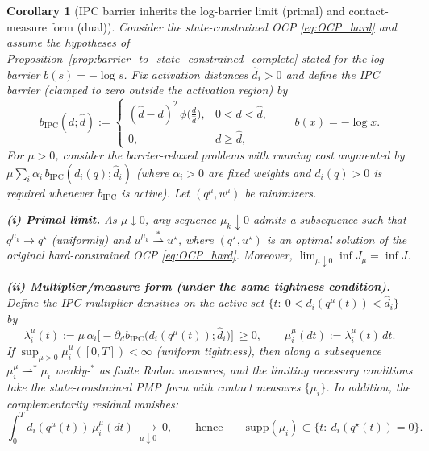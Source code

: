 \documentclass{article} %
\newtheorem{corollary}[theorem]{Corollary}
\begin{document}
\begin{corollary}[IPC barrier inherits the log-barrier limit (primal) and contact-measure form (dual)]
\label{cor:ipc_from_logbarrier}
Consider the state-constrained OCP \cref{eq:OCP_hard} and assume the hypotheses of
Proposition~\ref{prop:barrier_to_state_constrained_complete} stated for the \emph{log-barrier} $b(s)=-\log s$.
Fix activation distances $\hat d_i>0$ and define the IPC barrier (clamped to zero outside the activation region) by
\begin{equation}
\label{eq:ipc_barrier_def}
b_{\mathrm{IPC}}(d;\hat d)
:=
\begin{cases}
(\hat d-d)^2\,\phi\!\big(\frac{d}{\hat d}\big), & 0<d<\hat d,\\
0, & d\ge \hat d,
\end{cases}
\qquad b(x)=-\log x .
\end{equation}
For $\mu>0$, consider the barrier-relaxed problems with running cost augmented by
\(
\mu\sum_i \alpha_i\, b_{\mathrm{IPC}}(d_i(q);\hat d_i)
\)
(where $\alpha_i>0$ are fixed weights and $d_i(q)>0$ is required whenever $b_{\mathrm{IPC}}$ is active).
Let $(q^\mu,u^\mu)$ be minimizers.

\smallskip
\noindent\textbf{(i) Primal limit.}
As $\mu\downarrow 0$, any sequence $\mu_k\downarrow 0$ admits a subsequence such that
\(
q^{\mu_k}\to q^\star
\)
(uniformly) and
\(
u^{\mu_k}\overset{\ast}{\rightharpoonup} u^\star
\),
where $(q^\star,u^\star)$ is an optimal solution of the original hard-constrained OCP \cref{eq:OCP_hard}.
Moreover, $\lim_{\mu\downarrow 0}\inf J_\mu=\inf J$.

\smallskip
\noindent\textbf{(ii) Multiplier/measure form (under the same tightness condition).}
Define the IPC multiplier densities on the active set $\{t:\ 0<d_i(q^\mu(t))<\hat d_i\}$ by
\begin{equation}
\label{eq:ipc_lambda_density}
\lambda_i^\mu(t)
:=\mu\,\alpha_i\Big[-\partial_d b_{\mathrm{IPC}}\big(d_i(q^\mu(t));\hat d_i\big)\Big]\ \ge 0,
\qquad
\mu_i^\mu(dt):=\lambda_i^\mu(t)\,dt .
\end{equation}
If $\sup_{\mu>0}\mu_i^\mu([0,T])<\infty$ (uniform tightness), then along a subsequence
$\mu_i^\mu \rightharpoonup^\ast \mu_i$ weakly-$^\ast$ as finite Radon measures, and the limiting necessary conditions
take the state-constrained PMP form with contact measures $\{\mu_i\}$.
In addition, the complementarity residual vanishes:
\begin{equation}
\label{eq:ipc_comp_residual}
\int_0^T d_i(q^\mu(t))\,\mu_i^\mu(dt)\ \xrightarrow[\mu\downarrow 0]{}\ 0,
\qquad\text{hence}\qquad
\mathrm{supp}(\mu_i)\subset\{t:\ d_i(q^\star(t))=0\}.
\end{equation}
\end{corollary}
\end{document}
